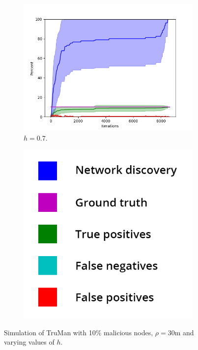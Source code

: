 \begin{figure}
\begin{subfigure}{0.5\textwidth}
\includegraphics[width=\linewidth]{images/plots/thresholds/07_30_10}
\caption{$h = 0.7$.} \label{fig:threshold07}
\end{subfigure}
\hspace*{\fill} %
\begin{subfigure}{0.3\textwidth}
\includegraphics[width=\linewidth]{images/legend2.png}
\end{subfigure}

\caption{Simulation of TruMan with 10\% malicious nodes, $\rho = 30$m and varying values of $h$.}
\label{fig:randomthresholds}
\end{figure}

